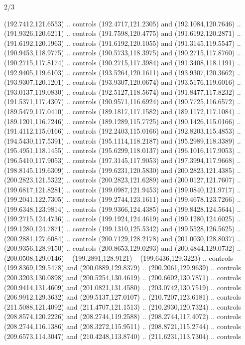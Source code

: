 \begin{flagdescription}{2/3}
\begin{scope}[xshift=0.5\flaglength,yshift=0.5\flagwidth,scale=\flagwidth/180]
\begin{scope}[y=0.8pt, x=0.8pt, yscale=-1,shift={(-168.75,-108.75)}]
  (192.7412,121.6553) .. controls (192.4717,121.2305) and (192.1084,120.7646) ..
  (191.9326,120.6211) .. controls (191.7598,120.4775) and (191.6192,120.2871) ..
  (191.6192,120.1963) .. controls (191.6192,120.1055) and (191.3145,119.5547) ..
  (190.9453,118.9775) .. controls (190.5733,118.3975) and (190.2715,117.8760) ..
  (190.2715,117.8174) .. controls (190.2715,117.3984) and (191.3408,118.1191) ..
  (192.9405,119.6103) .. controls (193.5264,120.1611) and (193.9307,120.3662) ..
  (193.9307,120.1201) .. controls (193.9307,120.0674) and (193.5176,119.6016) ..
  (193.0137,119.0830) .. controls (192.5127,118.5674) and (191.8477,117.8232) ..
  (191.5371,117.4307) .. controls (190.9571,116.6924) and (190.7725,116.6572) ..
  (189.5479,117.0410) .. controls (189.1817,117.1582) and (189.1172,117.1084) ..
  (189.1201,116.7246) .. controls (189.1289,115.7725) and (190.1426,115.0166) ..
  (191.4112,115.0166) .. controls (192.2403,115.0166) and (192.8203,115.4853) ..
  (194.5430,117.5391) .. controls (195.1114,118.2187) and (195.2989,118.3389) ..
  (195.4951,118.1455) .. controls (195.6299,118.0137) and (196.1016,117.9053) ..
  (196.5410,117.9053) .. controls (197.3145,117.9053) and (197.3994,117.9668) ..
  (198.8145,119.6309) .. controls (199.6231,120.5830) and (200.2823,121.4385) ..
  (200.2823,121.5322) .. controls (200.2823,121.6289) and (200.0127,121.7607) ..
  (199.6817,121.8281) .. controls (199.0987,121.9453) and (199.0840,121.9717) ..
  (199.2041,122.7305) .. controls (199.2744,123.1611) and (199.4678,123.7266) ..
  (199.6348,123.9814) .. controls (199.9366,124.4385) and (199.8428,124.5644) ..
  (199.2715,124.4736) .. controls (199.1924,124.4619) and (199.1280,124.6025) ..
  (199.1280,124.7871) .. controls (199.1310,125.5342) and (199.5528,126.5625) ..
  (200.2881,127.6084) .. controls (200.7129,128.2178) and (201.0030,128.8037) ..
  (200.9356,128.9150) .. controls (200.8653,129.0293) and (200.4844,129.0732) ..
  (200.0508,129.0146) -- (199.2891,128.9121) -- (199.6436,129.3223) .. controls
  (199.8369,129.5478) and (200.0889,129.8379) .. (200.2061,129.9639) .. controls
  (200.3203,130.0898) and (200.5254,130.4619) .. (200.6602,130.7871) .. controls
  (200.9414,131.4609) and (201.0821,131.4580) .. (203.0742,130.7519) .. controls
  (206.9912,129.3632) and (209.5137,127.0107) .. (210.7207,123.6181) .. controls
  (211.5088,121.4092) and (211.4707,121.1513) .. (210.2930,120.7324) .. controls
  (208.8574,120.2226) and (208.2744,119.2588) .. (208.2744,117.4072) .. controls
  (208.2744,116.1386) and (208.3272,115.9511) .. (208.8721,115.2744) .. controls
  (209.6573,114.3047) and (210.4248,113.8740) .. (211.6231,113.7304) .. controls

\end{scope}
\end{scope}
\end{flagdescription}
